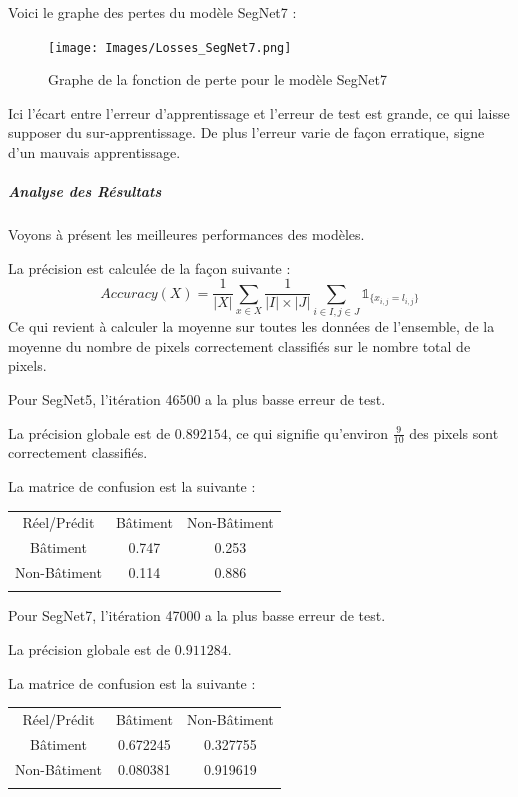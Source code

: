 \documentclass[a4paper, 11pt]{report}
\begin{document}
Voici le graphe des pertes du modèle SegNet7 :
\begin{figure}[H]
	\begin{center}
		\texttt{[image: Images/Losses\_SegNet7.png]}
		\caption{Graphe de la fonction de perte pour le modèle SegNet7}
	\end{center}
\end{figure}
Ici l'écart entre l'erreur d'apprentissage et l'erreur de test est grande, ce qui laisse supposer du sur-apprentissage.
De plus l'erreur varie de façon erratique, signe d'un mauvais apprentissage.
\subparagraph{Analyse des Résultats}
Voyons à présent les meilleures performances des modèles.

La précision est calculée de la façon suivante :
$$Accuracy(X) = \frac{1}{|X|}\sum_{x \in X} {\frac{1}{|I| \times |J|}\sum_{i \in I, j \in J} {\mathds{1}_{\{x_{i, j} = l_{i, j}\}}}}$$
Ce qui revient à calculer la moyenne sur toutes les données de l'ensemble, de la moyenne du nombre de pixels correctement classifiés sur le nombre total de pixels.

Pour SegNet5, l'itération 46500 a la plus basse erreur de test.

La précision globale est de $0.892154$, ce qui signifie qu'environ $\frac{9}{10}$ des pixels sont correctement classifiés.

La matrice de confusion est la suivante :
\begin{center}
\begin{tabularx}{0.5\textwidth}{c|c c|}
	Réel/Prédit & Bâtiment & \multicolumn{1}{c}{Non-Bâtiment} \\
	\hhline{---}
	Bâtiment & 0.747 \cellcolor[gray]{.8} & 0.253 \\
	Non-Bâtiment & 0.114 & 0.886 \cellcolor[gray]{.8}\\
	\hhline{~--}
\end{tabularx}
\end{center}


Pour SegNet7, l'itération 47000 a la plus basse erreur de test.

La précision globale est de $0.911284$.

La matrice de confusion est la suivante :
\begin{center}
\begin{tabularx}{0.5\textwidth}{c|c c|}
	Réel/Prédit & Bâtiment & \multicolumn{1}{c}{Non-Bâtiment} \\
	\hhline{---}
	Bâtiment & 0.672245 \cellcolor[gray]{.8} & 0.327755 \\
	Non-Bâtiment & 0.080381 & 0.919619 \cellcolor[gray]{.8}\\
	\hhline{~--}
\end{tabularx}
\end{center}
\end{document}
